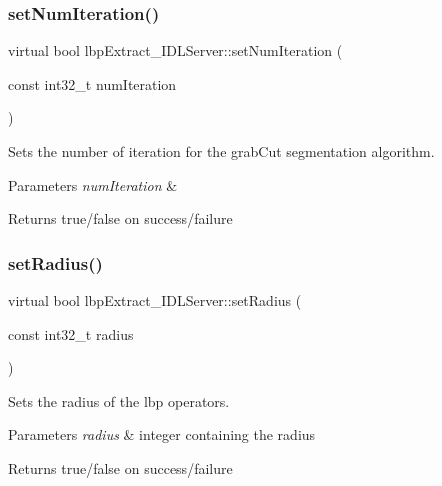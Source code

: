 \subsubsection{\texorpdfstring{setNumIteration()}{setNumIteration()}}
{\footnotesize\ttfamily virtual bool lbp\+Extract\+\_\+\+I\+D\+L\+Server\+::set\+Num\+Iteration (\begin{DoxyParamCaption}\item[{const int32\+\_\+t}]{num\+Iteration }\end{DoxyParamCaption})\hspace{0.3cm}{\ttfamily [virtual]}}



Sets the number of iteration for the grab\+Cut segmentation algorithm. 


\begin{DoxyParams}{Parameters}
{\em num\+Iteration} & \\
\hline
\end{DoxyParams}
\begin{DoxyReturn}{Returns}
true/false on success/failure 
\end{DoxyReturn}
\mbox{\label{classlbpExtract__IDLServer_a2391f554973a3b7d32d6eea6bbb233d7}} 
\subsubsection{\texorpdfstring{setRadius()}{setRadius()}}
{\footnotesize\ttfamily virtual bool lbp\+Extract\+\_\+\+I\+D\+L\+Server\+::set\+Radius (\begin{DoxyParamCaption}\item[{const int32\+\_\+t}]{radius }\end{DoxyParamCaption})\hspace{0.3cm}{\ttfamily [virtual]}}



Sets the radius of the lbp operators. 


\begin{DoxyParams}{Parameters}
{\em radius} & integer containing the radius \\
\hline
\end{DoxyParams}
\begin{DoxyReturn}{Returns}
true/false on success/failure 
\end{DoxyReturn}
\mbox{\label{classlbpExtract__IDLServer_a50677882bf32262601b91046a2dcdbf2}} 
